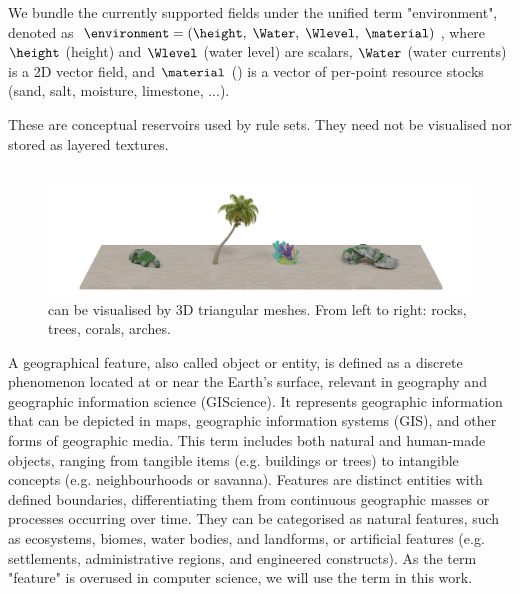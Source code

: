 We bundle the currently supported fields under the unified term "environment", denoted as $\environment = (\height, \; \Water, \; \Wlevel, \; \material)$,
where $\height$ (height) and $\Wlevel$ (water level) are scalars, $\Water$ (water currents) is a 2D vector field, and $\material$ () is a vector of per-point resource stocks (sand, salt, moisture, limestone, ...).

These  are conceptual reservoirs used by rule sets. They need not be visualised nor stored as layered textures.

\subsection{}
\label{sec:env-obj-environmental-objects}

\begin{figure}
    \includegraphics{assets-demo.pdf}
    \caption{ can be visualised by 3D triangular meshes. From left to right: rocks, trees, corals, arches.}
    \label{fig:env-obj-assets}
\end{figure}

A geographical feature, also called object or entity, is defined as a discrete phenomenon located at or near the Earth's surface, relevant in geography and geographic information science (GIScience). It represents geographic information that can be depicted in maps, geographic information systems (GIS), and other forms of geographic media. This term includes both natural and human-made objects, ranging from tangible items (e.g. buildings or trees) to intangible concepts (e.g. neighbourhoods or savanna). Features are distinct entities with defined boundaries, differentiating them from continuous geographic masses or processes occurring over time. They can be categorised as natural features, such as ecosystems, biomes, water bodies, and landforms, or artificial features (e.g. settlements, administrative regions, and engineered constructs). As the term "feature" is overused in computer science, we will use the term  in this work.


